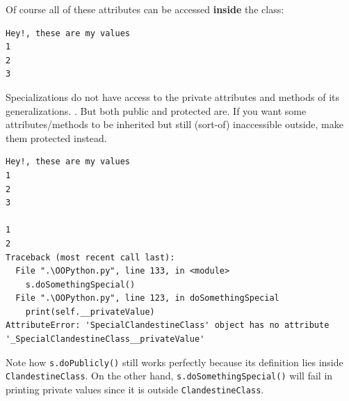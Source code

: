 Of course all of these attributes can be accessed \textbf{inside} the
class:

\begin{Shaded}
\begin{Highlighting}[]
\end{Highlighting}
\end{Shaded}

\begin{verbatim}
Hey!, these are my values
1
2
3
\end{verbatim}

Specializations do not have access to the private attributes and methods
of its generalizations. . But both public and protected are. If you want
some attributes/methods to be inherited but still (sort-of) inaccessible
outside, make them protected instead.

\begin{Shaded}
\begin{Highlighting}[]
    \NormalTok{):}
        \NormalTok{(}
        \NormalTok{(}
        \NormalTok{(}

\OperatorTok{=}\NormalTok{,}\NormalTok{,}\NormalTok{)}
    
\NormalTok{() }
\end{Highlighting}
\end{Shaded}

\begin{verbatim}
Hey!, these are my values
1
2
3

1
2
Traceback (most recent call last):
  File ".\OOPython.py", line 133, in <module>
    s.doSomethingSpecial()
  File ".\OOPython.py", line 123, in doSomethingSpecial
    print(self.__privateValue)
AttributeError: 'SpecialClandestineClass' object has no attribute '_SpecialClandestineClass__privateValue'
\end{verbatim}

Note how \texttt{s.doPublicly()} still works perfectly because its
definition lies inside \texttt{ClandestineClass}. On the other hand,
\texttt{s.doSomethingSpecial()} will fail in printing private values
since it is outside \texttt{ClandestineClass}.

